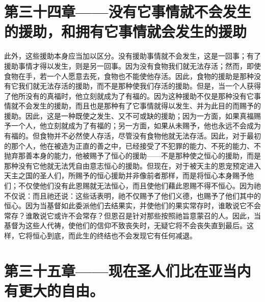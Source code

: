 
\section{第三十四章——没有它事情就不会发生的援助，和拥有它事情就会发生的援助}

此外，这些援助本身应当加以区分。没有援助事情就不会发生，这是一回事；有了援助事情才得以发生，则是另一回事。因为没有食物我们就无法存活；然而，即使食物在手，若一个人愿意去死，食物也不能使他存活。因此，食物的援助是那种没有它我们就无法存活的援助，而不是那种使我们存活的援助。但是，当一个人获得了他所没有的真福时，他立刻就成为了有福的。因为这种援助不仅是那种没有它事情就不会发生的援助，而且也是那种有了它事情就得以发生、并为此目的而赐予的援助。因此，这是一种既使之发生、又不可或缺的援助；因为一方面，如果真福赐予一个人，他立刻就成为了有福的；另一方面，如果从未赐予，他也永远不会成为有福的。但食物并不必然使人存活，尽管没有食物他就无法存活。因此，对于最初的那个人，他在被造为正直的善之中，已经接受了不犯罪的能力、不死的能力、不抛弃那善本身的能力，他被赐予了恒心的援助——不是那种使之恒心的援助，而是那种没有它他就无法凭自由意志恒心的援助。但现在，对于被天主的恩宠预定进入天主之国的圣人们，所赐予的恒心援助并非像前者那样，而是将恒心本身赐予他们；不仅使他们没有此恩赐就无法恒心，而且使他们藉此恩赐不得不恒心。因为祂不仅说：而且祂还说：这些话表明，祂不仅赐予了他们义德，也赐予了他们其中的恒心。因为当基督如此委派他们去结果实，并使他们的果实常存时，谁敢说它不会常存？谁敢说它或许不会常存？但恩召是针对那些按照祂旨意蒙召的人。因此，当基督为这些人代祷，使他们的信仰不致丧失时，无疑它将不会丧失直到最后。这样，它将恒心到底，而此生的终结也不会发现它有任何减退。\par


\section{第三十五章——现在圣人们比在亚当内有更大的自由。}

